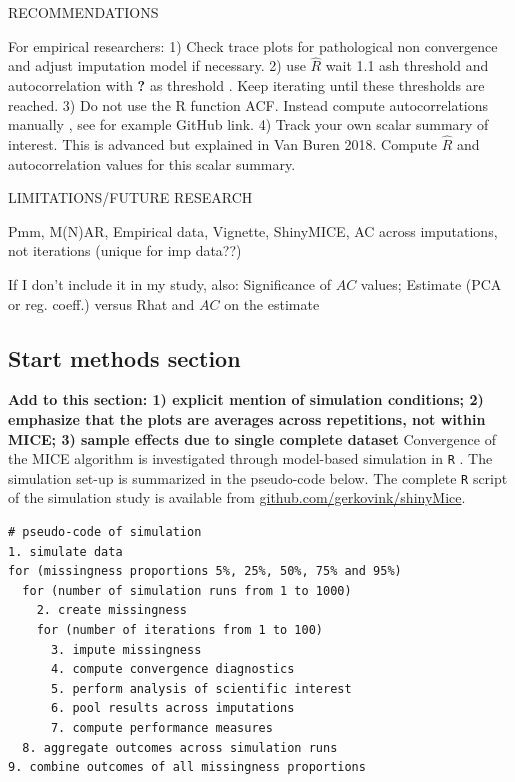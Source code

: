 \documentclass[Royal,times,sageh]{sagej}
\begin{document}
RECOMMENDATIONS

For empirical researchers: 1) Check trace plots for pathological non
convergence and adjust imputation model if necessary. 2) use
\(\widehat{R}\) wait 1.1 ash threshold and autocorrelation with
\textbf{?} as threshold . Keep iterating until these thresholds are
reached. 3) Do not use the R function ACF. Instead compute
autocorrelations manually , see for example GitHub link. 4) Track your
own scalar summary of interest. This is advanced but explained in Van
Buren 2018. Compute \(\widehat{R}\) and autocorrelation values for this
scalar summary.

LIMITATIONS/FUTURE RESEARCH

Pmm, M(N)AR, Empirical data, Vignette, ShinyMICE, AC across imputations,
not iterations (unique for imp data??)

If I don't include it in my study, also: Significance of \(AC\) values;
Estimate (PCA or reg. coeff.) versus Rhat and \(AC\) on the estimate

\hypertarget{start-methods-section}{%
\subsection{Start methods section}\label{start-methods-section}}

\textbf{Add to this section: 1) explicit mention of simulation
conditions; 2) emphasize that the plots are averages across repetitions,
not within MICE; 3) sample effects due to single complete dataset}
Convergence of the MICE algorithm is investigated through model-based
simulation in \texttt{R} \citep[version 3.6.3;][]{R}. The simulation
set-up is summarized in the pseudo-code below. The complete \texttt{R}
script of the simulation study is available from
\href{https://github.com/gerkovink/shinyMice/tree/master/3.Thesis/1.SimulationStudy}{github.com/gerkovink/shinyMice}.

\begin{verbatim}
# pseudo-code of simulation 
1. simulate data 
for (missingness proportions 5%, 25%, 50%, 75% and 95%)
  for (number of simulation runs from 1 to 1000)
    2. create missingness
    for (number of iterations from 1 to 100)
      3. impute missingness
      4. compute convergence diagnostics
      5. perform analysis of scientific interest
      6. pool results across imputations
      7. compute performance measures
  8. aggregate outcomes across simulation runs 
9. combine outcomes of all missingness proportions
\end{verbatim}
\end{document}
